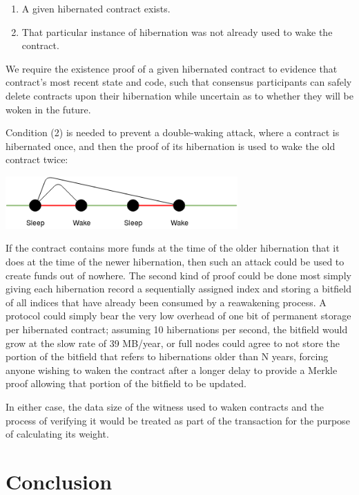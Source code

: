 \documentclass[12pt, final]{article}
\begin{document}
\begin{enumerate}
\item A given hibernated contract exists.
\item That particular instance of hibernation was not already used to wake the contract.
\end{enumerate}

We require the existence proof of a given hibernated contract to evidence that contract’s most recent state and code, such that consensus participants can safely delete contracts upon their hibernation while uncertain as to whether they will be woken in the future.

Condition (2) is needed to prevent a double-waking attack, where a contract is hibernated once, and then the proof of its hibernation is used to wake the old contract twice:

\begin{center}
\includegraphics[width=3.5in]{sleepwake.png} \\
\end{center}

If the contract contains more funds at the time of the older hibernation that it does at the time of the newer hibernation, then such an attack could be used to create funds out of nowhere. The second kind of proof could be done most simply giving each hibernation record a sequentially assigned index and storing a bitfield of all indices that have already been consumed by a reawakening process. A protocol could simply bear the very low overhead of one bit of permanent storage per hibernated contract; assuming 10 hibernations per second, the bitfield would grow at the slow rate of 39 MB/year, or full nodes could agree to not store the portion of the bitfield that refers to hibernations older than N years, forcing anyone wishing to waken the contract after a longer delay to provide a Merkle proof allowing that portion of the bitfield to be updated.

In either case, the data size of the witness used to waken contracts and the process of verifying it would be treated as part of the transaction for the purpose of calculating its weight.

\section{Conclusion}
\end{document}
